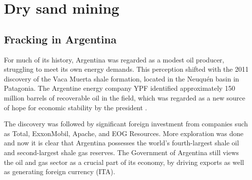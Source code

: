 \chapter{Dry sand mining}



\section{Fracking in Argentina}
For much of its history, Argentina was regarded as a modest oil producer, struggling to meet its own energy demands. This perception shifted with the 2011 discovery of the Vaca Muerta shale formation, located in the Neuquén basin in Patagonia. The Argentine energy company YPF identified approximately 150 million barrels of recoverable oil in the field, which was regarded as a new source of hope for economic stability by the president \autocite{kraussArgentinaHopesBig2011}.

The discovery was followed by significant foreign investment from companies such as Total, ExxonMobil, Apache, and EOG Resources. More exploration was done and now it is clear that Argentina possesses the world’s fourth-largest shale oil and second-largest shale gas reserves. The Government of Argentina still views the oil and gas sector as a crucial part of its economy, by driving exports as well as generating foreign currency (ITA).

